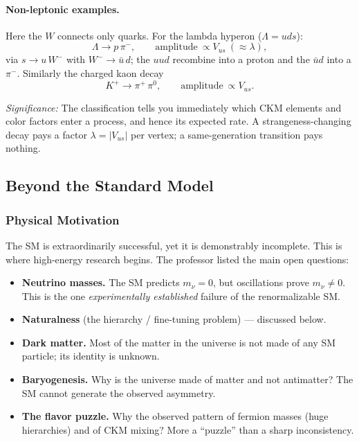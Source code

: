\paragraph{Non-leptonic examples.}
Here the $W$ connects only quarks. For the lambda hyperon
($\Lambda=uds$):
\begin{equation}
  \Lambda \to p\,\pi^- ,
  \qquad \text{amplitude}\ \propto V_{us}\ (\approx\lambda),
  \label{eq:lec21:lambdadecay}
\end{equation}
via $s\to u\,W^-$ with $W^-\to \bar u\,d$; the $uud$ recombine into a
proton and the $\bar u d$ into a $\pi^-$. Similarly the charged kaon
decay
\begin{equation}
  K^+ \to \pi^+\,\pi^0 ,
  \qquad \text{amplitude}\ \propto V_{us}.
  \label{eq:lec21:kaondecay}
\end{equation}

\textit{Significance:} The classification tells you immediately which
CKM elements and color factors enter a process, and hence its expected
rate. A strangeness-changing decay pays a factor $\lambda=|V_{us}|$ per
vertex; a same-generation transition pays nothing.


\subsection{Beyond the Standard Model}\label{subsec:lec21:bsm}

\subsubsection*{Physical Motivation}

The SM is extraordinarily successful, yet it is demonstrably incomplete.
This is where high-energy research begins. The professor listed the main
open questions:
\begin{itemize}
  \item \textbf{Neutrino masses.} The SM predicts $m_\nu=0$, but
        oscillations prove $m_\nu\neq0$. This is the one
        \emph{experimentally established} failure of the renormalizable
        SM.
  \item \textbf{Naturalness} (the hierarchy / fine-tuning problem) ---
        discussed below.
  \item \textbf{Dark matter.} Most of the matter in the universe is not
        made of any SM particle; its identity is unknown.
  \item \textbf{Baryogenesis.} Why is the universe made of matter and
        not antimatter? The SM cannot generate the observed asymmetry.
  \item \textbf{The flavor puzzle.} Why the observed pattern of fermion
        masses (huge hierarchies) and of CKM mixing? More a ``puzzle''
        than a sharp inconsistency.
\end{itemize}

